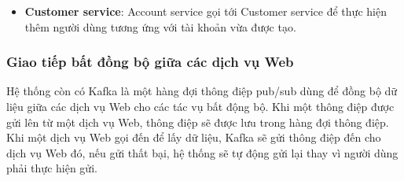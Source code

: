 \begin{itemize}
	\item \textbf{Customer service}: Account service gọi tới Customer service để thực hiện thêm người dùng tương ứng với tài khoản vừa được tạo.
\end{itemize}

\subsubsection{Giao tiếp bất đồng bộ giữa các dịch vụ Web}

Hệ thống còn có Kafka là một hàng đợi thông điệp pub/sub dùng để đồng bộ dữ liệu giữa các dịch vụ Web cho các tác vụ bất động bộ. Khi một thông điệp được gửi lên từ một dịch vụ Web, thông điệp sẽ được lưu trong hàng đợi thông điệp. Khi một dịch vụ Web gọi đến để lấy dữ liệu, Kafka sẽ gửi thông điệp đến cho dịch vụ Web đó, nếu gửi thất bại, hệ thống sẽ tự động gửi lại thay vì người dùng phải thực hiện gửi.

